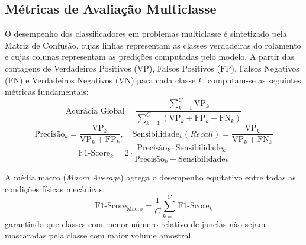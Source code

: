 \subsection{Métricas de Avaliação Multiclasse}
\label{subsec:metricas_avaliacao}

O desempenho dos classificadores em problemas multiclasse é sintetizado pela Matriz de Confusão, cujas linhas representam as classes verdadeiras do rolamento e cujas colunas representam as predições computadas pelo modelo. A partir das contagens de Verdadeiros Positivos ($\text{VP}$), Falsos Positivos ($\text{FP}$), Falsos Negativos ($\text{FN}$) e Verdadeiros Negativos ($\text{VN}$) para cada classe $k$, computam-se as seguintes métricas fundamentais:
\begin{equation}
    \text{Acurácia Global} = \frac{\sum_{k=1}^{C} \text{VP}_k}{\sum_{k=1}^{C} (\text{VP}_k + \text{FP}_k + \text{FN}_k)}
    \label{eq:acuracia}
\end{equation}
\begin{equation}
    \text{Precisão}_k = \frac{\text{VP}_k}{\text{VP}_k + \text{FP}_k}, \quad \text{Sensibilidade}_k (\textit{Recall}) = \frac{\text{VP}_k}{\text{VP}_k + \text{FN}_k}
    \label{eq:precisao_recall}
\end{equation}
\begin{equation}
    \text{F1-Score}_k = 2 \cdot \frac{\text{Precisão}_k \cdot \text{Sensibilidade}_k}{\text{Precisão}_k + \text{Sensibilidade}_k}
    \label{eq:f1_score}
\end{equation}

A média macro (\textit{Macro Average}) agrega o desempenho equitativo entre todas as condições físicas mecânicas:
\begin{equation}
    \text{F1-Score}_{\text{Macro}} = \frac{1}{C} \sum_{k=1}^{C} \text{F1-Score}_k
    \label{eq:f1_macro}
\end{equation}
garantindo que classes com menor número relativo de janelas não sejam mascaradas pela classe com maior volume amostral.
